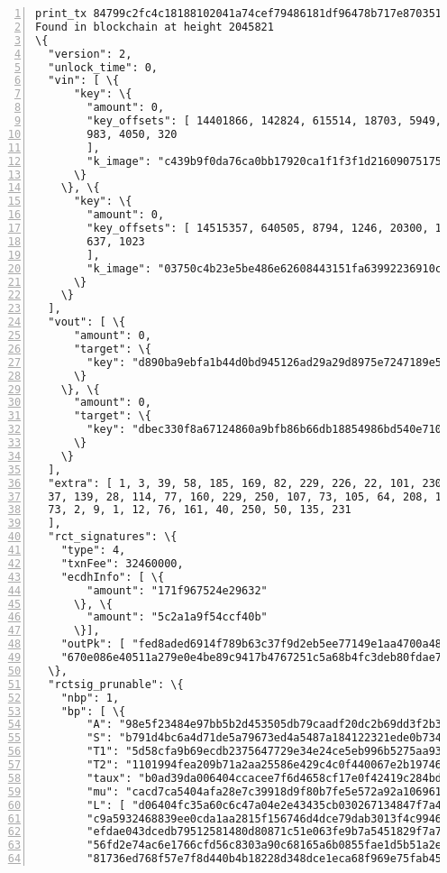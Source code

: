 \begin{appendices}
\begin{Verbatim}[commandchars=\\\{\}, numbers=left]
print_tx 84799c2fc4c18188102041a74cef79486181df96478b717e8703512c7f7f3349
Found in blockchain at height 2045821
\{
  "version": 2, 
  "unlock_time": 0, 
  "vin": [ \{
      "key": \{
        "amount": 0, 
        "key_offsets": [ 14401866, 142824, 615514, 18703, 5949, 22840, 5572, 16439,
        983, 4050, 320
        ], 
        "k_image": "c439b9f0da76ca0bb17920ca1f1f3f1d216090751752b091bef9006918cb3db4"
      \}
    \}, \{
      "key": \{
        "amount": 0, 
        "key_offsets": [ 14515357, 640505, 8794, 1246, 20300, 18577, 17108, 9824, 581,
        637, 1023
        ], 
        "k_image": "03750c4b23e5be486e62608443151fa63992236910c41fa0c4a0a938bc6f5a37"
      \}
    \}
  ], 
  "vout": [ \{
      "amount": 0, 
      "target": \{
        "key": "d890ba9ebfa1b44d0bd945126ad29a29d8975e7247189e5076c19fa7e3a8cb00"
      \}
    \}, \{
      "amount": 0, 
      "target": \{
        "key": "dbec330f8a67124860a9bfb86b66db18854986bd540e710365ad6079c8a1c7b0"
      \}
    \}
  ], 
  "extra": [ 1, 3, 39, 58, 185, 169, 82, 229, 226, 22, 101, 230, 254, 20, 143,
  37, 139, 28, 114, 77, 160, 229, 250, 107, 73, 105, 64, 208, 154, 182, 158, 200,
  73, 2, 9, 1, 12, 76, 161, 40, 250, 50, 135, 231
  ], 
  "rct_signatures": \{
    "type": 4, 
    "txnFee": 32460000, 
    "ecdhInfo": [ \{
        "amount": "171f967524e29632"
      \}, \{
        "amount": "5c2a1a9f54ccf40b"
      \}], 
    "outPk": [ "fed8aded6914f789b63c37f9d2eb5ee77149e1aa4700a482aea53f82177b3b41",
    "670e086e40511a279e0e4be89c9417b4767251c5a68b4fc3deb80fdae7269c17"]
  \}, 
  "rctsig_prunable": \{
    "nbp": 1, 
    "bp": [ \{
        "A": "98e5f23484e97bb5b2d453505db79caadf20dc2b69dd3f2b3dbf2a53ca280216", 
        "S": "b791d4bc6a4d71de5a79673ed4a5487a184122321ede0b7341bc3fdc0915a796", 
        "T1": "5d58cfa9b69ecdb2375647729e34e24ce5eb996b5275aa93f9871259f3a1aecd", 
        "T2": "1101994fea209b71a2aa25586e429c4c0f440067e2b197469aa1a9a1512f84b7", 
        "taux": "b0ad39da006404ccacee7f6d4658cf17e0f42419c284bdca03c0250303706c03", 
        "mu": "cacd7ca5404afa28e7c39918d9f80b7fe5e572a92a10696186d029b4923fa200", 
        "L": [ "d06404fc35a60c6c47a04e2e43435cb030267134847f7a49831a61f82307fc32",
        "c9a5932468839ee0cda1aa2815f156746d4dce79dab3013f4c9946fce6b69eff",
        "efdae043dcedb79512581480d80871c51e063fe9b7a5451829f7a7824bcc5a0b",
        "56fd2e74ac6e1766cfd56c8303a90c68165a6b0855fae1d5b51a2e035f333a1d",
        "81736ed768f57e7f8d440b4b18228d348dce1eca68f969e75fab458f44174c99",

\end{Verbatim}
\end{appendices}
